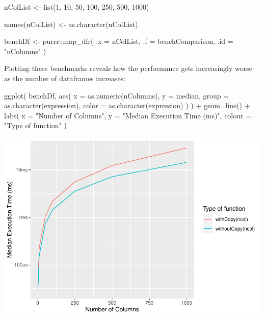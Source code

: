 \documentclass[
]{book}
\newenvironment{Shaded}{\begin{snugshade}}{\end{snugshade}}
\newcommand{\AttributeTok}[1]{\textcolor[rgb]{0.77,0.63,0.00}{#1}}
\newcommand{\DecValTok}[1]{\textcolor[rgb]{0.00,0.00,0.81}{#1}}
\newcommand{\FunctionTok}[1]{\textcolor[rgb]{0.00,0.00,0.00}{#1}}
\newcommand{\NormalTok}[1]{#1}
\newcommand{\OtherTok}[1]{\textcolor[rgb]{0.56,0.35,0.01}{#1}}
\newcommand{\SpecialCharTok}[1]{\textcolor[rgb]{0.00,0.00,0.00}{#1}}
\newcommand{\StringTok}[1]{\textcolor[rgb]{0.31,0.60,0.02}{#1}}
\begin{document}
\begin{Shaded}
\begin{Highlighting}[]
\NormalTok{nColList }\OtherTok{\textless{}{-}} \FunctionTok{list}\NormalTok{(}\DecValTok{1}\NormalTok{, }\DecValTok{10}\NormalTok{, }\DecValTok{50}\NormalTok{, }\DecValTok{100}\NormalTok{, }\DecValTok{250}\NormalTok{, }\DecValTok{500}\NormalTok{, }\DecValTok{1000}\NormalTok{)}

\FunctionTok{names}\NormalTok{(nColList) }\OtherTok{\textless{}{-}} \FunctionTok{as.character}\NormalTok{(nColList)}

\NormalTok{benchDf }\OtherTok{\textless{}{-}}\NormalTok{ purrr}\SpecialCharTok{::}\FunctionTok{map\_dfr}\NormalTok{(}
  \AttributeTok{.x =}\NormalTok{ nColList,}
  \AttributeTok{.f =}\NormalTok{ benchComparison,}
  \AttributeTok{.id =} \StringTok{"nColumns"}
\NormalTok{)}
\end{Highlighting}
\end{Shaded}

Plotting these benchmarks reveals how the performance gets increasingly worse as the number of dataframes increases:

\begin{Shaded}
\begin{Highlighting}[]
\FunctionTok{ggplot}\NormalTok{(}
\NormalTok{  benchDf,}
  \FunctionTok{aes}\NormalTok{(}
    \AttributeTok{x =} \FunctionTok{as.numeric}\NormalTok{(nColumns),}
    \AttributeTok{y =}\NormalTok{ median,}
    \AttributeTok{group =} \FunctionTok{as.character}\NormalTok{(expression),}
    \AttributeTok{color =} \FunctionTok{as.character}\NormalTok{(expression)}
\NormalTok{  )}
\NormalTok{) }\SpecialCharTok{+}
  \FunctionTok{geom\_line}\NormalTok{() }\SpecialCharTok{+}
  \FunctionTok{labs}\NormalTok{(}
    \AttributeTok{x =} \StringTok{"Number of Columns"}\NormalTok{,}
    \AttributeTok{y =} \StringTok{"Median Execution Time (ms)"}\NormalTok{,}
    \AttributeTok{colour =} \StringTok{"Type of function"}
\NormalTok{  )}
\end{Highlighting}
\end{Shaded}

\includegraphics{Names-values_files/figure-latex/unnamed-chunk-29-1.pdf}
\end{document}
